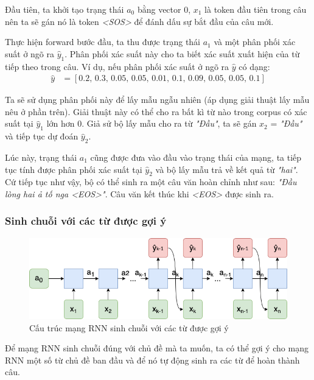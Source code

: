 Đầu tiên, ta khởi tạo trạng thái $a_0$ bằng vector 0, $x_1$ là token đầu tiên trong câu nên ta sẽ gán nó là token \textit{<SOS>} để đánh dấu sự bắt đầu của câu mới.

Thực hiện forward bước đầu, ta thu được trạng thái $a_1$ và một phân phối xác suất ở ngõ ra $\hat{y}_1$. Phân phối xác suất này cho ta biết xác suất xuất hiện của từ tiếp theo trong câu. Ví dụ, nếu phân phối xác suất ở ngõ ra $\hat{y}$ có dạng:
\begin{align*}
  \hat{y} &= [0.2, \, 0.3, \, 0.05, \, 0.05, \, 0.01, \, 0.1, \, 0.09, \, 0.05, \, 0.05, \, 0.1]
\end{align*}

Ta sẽ sử dụng phân phối này để lấy mẫu ngẫu nhiên (áp dụng giải thuật lấy mẫu nêu ở phần trên). Giải thuật này có thể cho ra bất kì từ nào trong corpus có xác suất tại $\hat{y}_1$ lớn hơn 0. Giả sử bộ lấy mẫu cho ra từ \textit{"Đầu"}, ta sẽ gán $x_2$ = \textit{"Đầu"} \, và tiếp tục dự đoán $\hat{y}_2$.

Lúc này, trạng thái $a_1$ cũng được đưa vào đầu vào trạng thái của mạng, ta tiếp tục tính được phân phối xác suất tại $\hat{y}_2$ và bộ lấy mẫu trả về kết quả từ \textit{"hai"}. Cứ tiếp tục như vậy, bộ có thể sinh ra một câu văn hoàn chỉnh như sau: \textit{"Đầu lòng hai ả tố nga <EOS>"}. Câu văn kết thúc khi \textit{<EOS>} được sinh ra.

\subsubsection{Sinh chuỗi với các từ được gợi ý}

\begin{figure}[h!]
	\centering
		\includegraphics[width=1\columnwidth]{books/artificial-neural-network/chapter07/figure-sec3/rnn_network2.png}
		\centering
	\caption{Cấu trúc mạng RNN sinh chuỗi với các từ được gợi ý}
\end{figure}

Để mạng RNN sinh chuỗi đúng với chủ đề mà ta muốn, ta có thể gợi ý cho mạng RNN một số từ chủ đề ban đầu và để nó tự động sinh ra các từ để hoàn thành câu.

